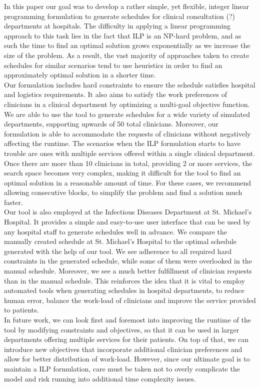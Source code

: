 In this paper our goal was to develop a rather simple, yet flexible, integer linear programming formulation to generate schedules for clinical consultation (?) departments at hospitals. The difficulty in applying a linear programming approach to this task lies in the fact that ILP is an NP-hard problem, and as such the time to find an optimal solution grows exponentially as we increase the size of the problem. As a result, the vast majority of approaches taken to create schedules for similar scenarios tend to use heuristics in order to find an approximately optimal solution in a shorter time. \\

Our formulation includes hard constraints to ensure the schedule satisfies hospital and logistics requirements. It also aims to satisfy the work preferences of clinicians in a clinical department by optimizing a multi-goal objective function. We are able to use the tool to generate schedules for a wide variety of simulated departments, supporting upwards of 50 total clinicians. Moreover, our formulation is able to accommodate the requests of clinicians without negatively affecting the runtime. The scenarios when the ILP formulation starts to have trouble are ones with multiple services offered within a single clinical department. Once there are more than 10 clinicians in total, providing 2 or more services, the search space becomes very complex, making it difficult for the tool to find an optimal solution in a reasonable amount of time. For these cases, we recommend allowing consecutive blocks, to simplify the problem and find a solution much faster. \\

Our tool is also employed at the Infectious Diseases Department at St. Michael's Hospital. It provides a simple and easy-to-use user interface that can be used by any hospital staff to generate schedules well in advance. We compare the manually created schedule at St. Michael's Hospital to the optimal schedule generated with the help of our tool. We see adherence to all required hard constraints in the generated schedule, while some of them were overlooked in the manual schedule. Moreover, we see a much better fulfillment of clinician requests than in the manual schedule. This reinforces the idea that it is vital to employ automated tools when generating schedules in hospital departments, to reduce human error, balance the work-load of clinicians and improve the service provided to patients. \\

In future work, we can look first and foremost into improving the runtime of the tool by modifying constraints and objectives, so that it can be used in larger departments offering multiple services for their patients. On top of that, we can introduce new objectives that incorporate additional clinician preferences and allow for better distribution of work-load. However, since our ultimate goal is to maintain a ILP formulation, care must be taken not to overly complicate the model and risk running into additional time complexity issues.